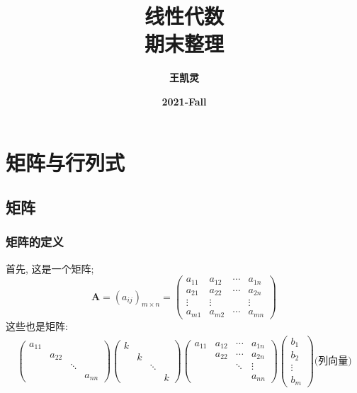 \documentclass{article}
\title{\textbf{
		\zihao{1}线性代数\\
		\zihao{2}期末整理}}
\author{\textbf{王凯灵}}
\date{\textbf{2021-Fall}}
\begin{document}
	\maketitle
	\tableofcontents
	\newpage
	\section{矩阵与行列式}
		\subsection{矩阵}
			\subsubsection{矩阵的定义}
				首先, 这是一个矩阵;
				$$
				\boldsymbol{A}=\left(a_{i j}\right)_{m \times n}=
				\left(\begin{array}{cccc}
					a_{11} & a_{12} & \cdots & a_{1 n} \\
					a_{21} & a_{22} & \cdots & a_{2 n} \\
					\vdots & \vdots & & \vdots \\
					a_{m 1} & a_{m 2} & \cdots & a_{m n}
				\end{array}\right)
				$$
				这些也是矩阵:
				$$
				\begin{aligned}
					\left(\begin{array}{cccc}
						a_{11} & & & \\
						& a_{22} & & \\
						& & \ddots & \\
						& & & a_{n n}
					\end{array}\right)
					\left(\begin{array}{cccc}
						k & & & \\
						& k & & \\
						& & \ddots & \\
						& & & k
					\end{array}\right)
					\left(\begin{array}{cccc}
						a_{11} & a_{12} & \cdots & a_{1 n} \\
						& a_{22} & \cdots & a_{2 n} \\
						& & \ddots & \vdots \\
						& & & a_{n n}
					\end{array}\right)
					\left(\begin{array}{c}
						b_{1} \\
						b_{2} \\
						\vdots \\
						b_{m}
					\end{array}\right)\text{(列向量)}
				\end{aligned}
				$$
\end{document}
